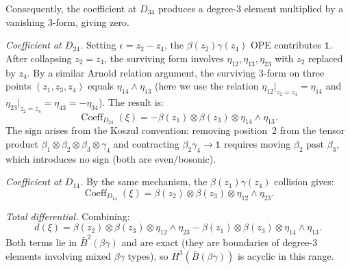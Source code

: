 \begin{computation}
Consequently, the coefficient at $D_{34}$ produces a
degree-$3$ element multiplied by a vanishing $3$-form, giving
zero.

\emph{Coefficient at $D_{24}$.}
Setting $\epsilon = z_2 - z_4$, the $\beta(z_2)\gamma(z_4)$ OPE
contributes $\mathbb{1}$. After collapsing $z_2 = z_4$, the surviving
form involves $\eta_{12}, \eta_{13}, \eta_{23}$ with $z_2$ replaced
by $z_4$. By a similar Arnold relation argument, the surviving
$3$-form on three points $(z_1, z_3, z_4)$ equals
$\eta_{14} \wedge \eta_{13}$ (here we use the relation
$\eta_{12}|_{z_2 = z_4} = \eta_{14}$ and
$\eta_{23}|_{z_2 = z_4} = \eta_{43} = -\eta_{34}$). The result is:
\begin{equation}\label{eq:bbbg-D24-residue}
\operatorname{Coeff}_{D_{24}}(\xi) =
-\beta(z_1) \otimes \beta(z_3) \otimes \eta_{14} \wedge \eta_{13}.
\end{equation}
The sign arises from the Koszul convention: removing position~2
from the tensor product $\beta_1 \otimes \beta_2 \otimes \beta_3
\otimes \gamma_4$ and contracting $\beta_2 \gamma_4 \to \mathbb{1}$
requires moving $\beta_2$ past $\beta_3$, which introduces no sign
(both are even/bosonic).

\emph{Coefficient at $D_{14}$.}
By the same mechanism, the $\beta(z_1)\gamma(z_4)$ collision gives:
\begin{equation}\label{eq:bbbg-D14-residue}
\operatorname{Coeff}_{D_{14}}(\xi) =
\beta(z_2) \otimes \beta(z_3) \otimes \eta_{12} \wedge \eta_{23}.
\end{equation}

\emph{Total differential.} Combining:
\begin{equation}\label{eq:bbbg-total}
d(\xi) = \beta(z_2) \otimes \beta(z_3) \otimes \eta_{12}
\wedge \eta_{23}
- \beta(z_1) \otimes \beta(z_3) \otimes \eta_{14}
\wedge \eta_{13}.
\end{equation}
Both terms lie in $\bar{B}^2(\beta\gamma)$ and are exact
(they are boundaries of degree-$3$ elements involving mixed
$\beta\gamma$ types), so $H^3(\bar{B}(\beta\gamma))$ is acyclic in this range.
\end{computation}

